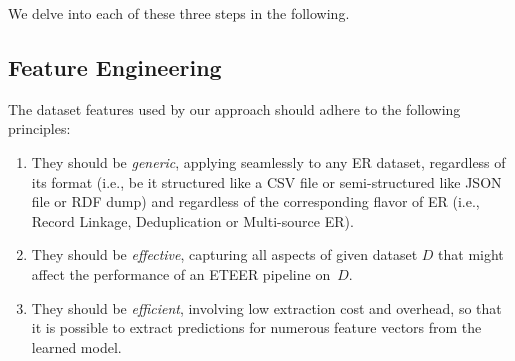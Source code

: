 
We delve into each of these three steps in the following.

\subsection{Feature Engineering}
\label{sec:datasetProfiling}

The dataset features used by our approach should adhere to the following principles: 
\begin{enumerate}[leftmargin=*]
    \item They should be \textit{generic}, applying seamlessly to any ER dataset, regardless of its format (i.e., be it structured like a CSV file or semi-structured like JSON file or RDF dump) and regardless of the corresponding flavor of ER (i.e., Record Linkage, Deduplication or Multi-source ER).
    \item They should be \textit{effective}, capturing all aspects of given dataset $D$ that might affect the performance of an ETEER pipeline on~$D$.
    \item They should be \textit{efficient}, involving low extraction cost and overhead, so that it is possible to extract predictions for numerous feature vectors from the learned model.
\end{enumerate}

